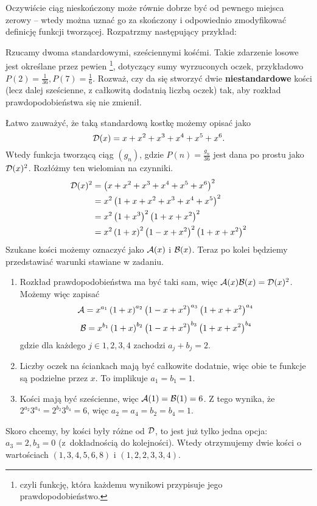 \documentclass{scrartcl}
\begin{document}
    Oczywiście ciąg nieskończony może równie dobrze być od pewnego miejsca zerowy -- wtedy można uznać go za skończony i odpowiednio zmodyfikować definicję funkcji tworzącej. Rozpatrzmy następujący przykład:
    \begin{example}
        Rzucamy dwoma standardowymi, sześciennymi kośćmi. Takie zdarzenie losowe jest określane przez pewien \footnote{czyli funkcję, która każdemu wynikowi przypisuje jego prawdopodobieństwo.}, dotyczący sumy wyrzuconych oczek, przykładowo $P(2) = \frac{1}{36}, P(7) = \frac{1}{6}$. Rozważ, czy da się stworzyć dwie \textbf{niestandardowe} kości (lecz dalej sześcienne, z całkowitą dodatnią liczbą oczek) tak, aby rozkład prawdopodobieństwa się nie zmienił.
    \end{example}
    \begin{solution}
        Łatwo zauważyć, że taką standardową kostkę możemy opisać jako
        $$ \mathcal D(x) = x + x^2 + x^3 + x^4 + x^5 + x^6. $$
        Wtedy funkcja tworzącą ciąg $(g_n)$, gdzie $P(n) = \frac{g_n}{36}$ jest dana po prostu jako $\mathcal D(x)^2$. Rozłóżmy ten wielomian na czynniki.
        \begin{align*}
            \mathcal D(x)^2 &= \left(x + x^2 + x^3 + x^4 + x^5 + x^6\right)^2 \\
                    &= x^2\left(1 + x + x^2 + x^3 + x^4 + x^5\right)^2 \\
                    &= x^2\left(1 + x^3\right)^2\left(1 + x + x^2\right)^2 \\
                    &= x^2\left(1 + x\right)^2\left(1 - x + x^2\right)^2\left(1 + x + x^2\right)^2
        \end{align*}
        Szukane kości możemy oznaczyć jako $\mathcal A(x)$ i $\mathcal B(x)$. Teraz po kolei będziemy przedstawiać warunki stawiane w zadaniu.
        \begin{enumerate}
            \item Rozkład prawdopodobieństwa ma być taki sam, więc $\mathcal A(x)\mathcal B(x) = \mathcal D(x)^2$. Możemy więc zapisać
            $$ \mathcal A = x^{a_1}\left(1 + x\right)^{a_2}\left(1 - x + x^2\right)^{a_3}\left(1 + x + x^2\right)^{a_4} $$
            $$ \mathcal B = x^{b_1}\left(1 + x\right)^{b_2}\left(1 - x + x^2\right)^{b_3}\left(1 + x + x^2\right)^{b_4} $$
            gdzie dla każdego $j\in{1,2,3,4}$ zachodzi $a_j + b_j = 2$.
            \item Liczby oczek na ściankach mają być całkowite dodatnie, więc obie te funkcje są podzielne przez $x$. To implikuje $a_1 = b_1 = 1$.
            \item Kości mają być sześcienne, więc $\mathcal A(1) = \mathcal B(1) = 6$. Z tego wynika, że $2^{a_2}3^{a_4} = 2^{b_2}3^{b_4} = 6$, więc $a_2 = a_4 = b_2 = b_4 = 1$.
        \end{enumerate}
        Skoro chcemy, by kości były różne od $\mathcal D$, to jest już tylko jedna opcja: $a_3 = 2, b_3 = 0$ (z~dokładnością do kolejności). Wtedy otrzymujemy dwie kości o wartościach $(1, 3, 4, 5, 6, 8)$ i $(1, 2, 2, 3, 3, 4)$.
    \end{solution}
\end{document}
